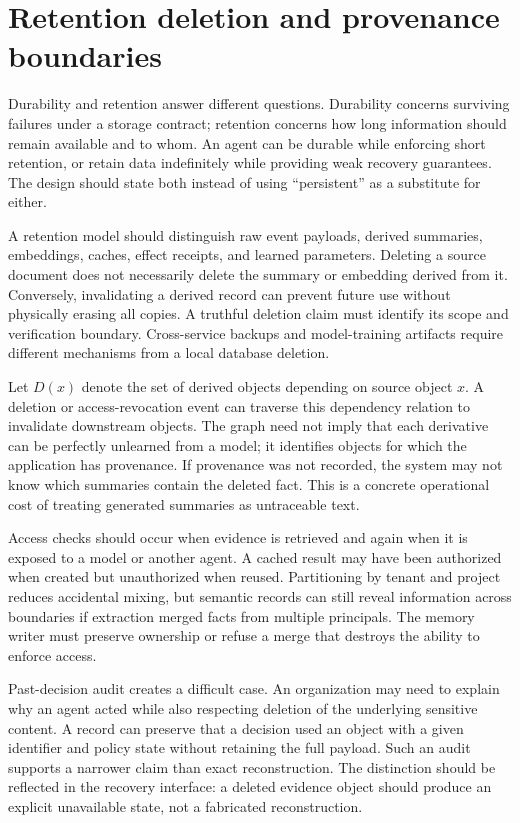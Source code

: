 \section{Retention deletion and provenance boundaries}\label{sec:C13:retention}
Durability and retention answer different questions. Durability concerns surviving failures under a storage contract; retention concerns how long information should remain available and to whom. An agent can be durable while enforcing short retention, or retain data indefinitely while providing weak recovery guarantees. The design should state both instead of using ``persistent'' as a substitute for either.

A retention model should distinguish raw event payloads, derived summaries, embeddings, caches, effect receipts, and learned parameters. Deleting a source document does not necessarily delete the summary or embedding derived from it. Conversely, invalidating a derived record can prevent future use without physically erasing all copies. A truthful deletion claim must identify its scope and verification boundary. Cross-service backups and model-training artifacts require different mechanisms from a local database deletion.

Let $D(x)$ denote the set of derived objects depending on source object $x$. A deletion or access-revocation event can traverse this dependency relation to invalidate downstream objects. The graph need not imply that each derivative can be perfectly unlearned from a model; it identifies objects for which the application has provenance. If provenance was not recorded, the system may not know which summaries contain the deleted fact. This is a concrete operational cost of treating generated summaries as untraceable text.

Access checks should occur when evidence is retrieved and again when it is exposed to a model or another agent. A cached result may have been authorized when created but unauthorized when reused. Partitioning by tenant and project reduces accidental mixing, but semantic records can still reveal information across boundaries if extraction merged facts from multiple principals. The memory writer must preserve ownership or refuse a merge that destroys the ability to enforce access.

Past-decision audit creates a difficult case. An organization may need to explain why an agent acted while also respecting deletion of the underlying sensitive content. A record can preserve that a decision used an object with a given identifier and policy state without retaining the full payload. Such an audit supports a narrower claim than exact reconstruction. The distinction should be reflected in the recovery interface: a deleted evidence object should produce an explicit unavailable state, not a fabricated reconstruction.

